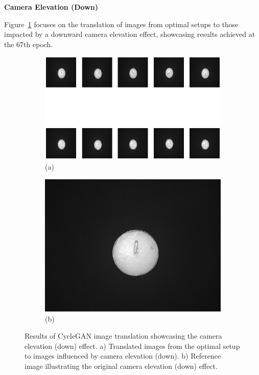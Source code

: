 \documentclass[12pt,DIV14,BCOR12mm,a4paper,footinclude=false,headinclude,parskip=half-,twoside,openright,cleardoublepage=empty,toc=index,bibliography=totoc,listof=totoc]{scrreprt}
\numberwithin{equation}{chapter}
\begin{document}
\textbf{Camera Elevation (Down)}

Figure~\ref{fig:camera_elevation_down_result} focuses on the translation of images from optimal setups to those impacted by a downward camera elevation effect, showcasing results achieved at the 67th epoch.

\begin{figure}
    \centering
    \begin{subfigure}[b]{1.0\textwidth}
        \centering
        \includegraphics[width=\textwidth]{../media/candles_bright.png}
        \caption*{(a)}
    \end{subfigure}
    \hfill
    \begin{subfigure}[b]{0.25\textwidth}
        \centering
        \includegraphics[width=\textwidth]{../media/candles_bright_real.png}
        \caption*{(b)}
    \end{subfigure}
    \caption{Results of CycleGAN image translation showcasing the camera elevation (down) effect. a) Translated images from the optimal setup to images influenced by camera elevation (down). b) Reference image illustrating the original camera elevation (down) effect.}
    \label{fig:camera_elevation_down_result}
\end{figure}
\end{document}

